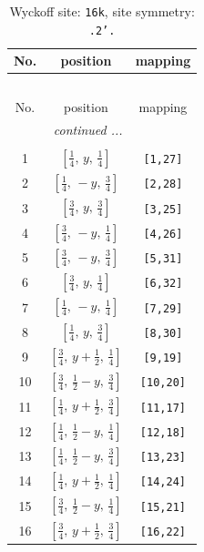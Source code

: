 \documentclass[fleqn,8pt]{jsarticle}
\begin{document}
\renewcommand{\arraystretch}{1.2}
\begin{longtable}{ccc}
\caption{Wyckoff site: {\tt 16k}, site symmetry: {\tt .2'.}}
 \\
 \hline \hline
No. & position & mapping \\ \hline \endfirsthead

\multicolumn{2}{l}{\tablename\ \thetable{}} \\
 \hline \hline
No. & position & mapping \\ \hline \endhead

 \hline \hline
\multicolumn{2}{r}{\footnotesize\it continued ...} \\ \endfoot

 \hline \hline
\multicolumn{2}{r}{} \\ \endlastfoot

1 & $\left[ \frac{1}{4},\, y,\, \frac{1}{4} \right]$ & {\tt [1,27]} \\ \hline
2 & $\left[ \frac{1}{4},\, - y,\, \frac{3}{4} \right]$ & {\tt [2,28]} \\ \hline
3 & $\left[ \frac{3}{4},\, y,\, \frac{3}{4} \right]$ & {\tt [3,25]} \\ \hline
4 & $\left[ \frac{3}{4},\, - y,\, \frac{1}{4} \right]$ & {\tt [4,26]} \\ \hline
5 & $\left[ \frac{3}{4},\, - y,\, \frac{3}{4} \right]$ & {\tt [5,31]} \\ \hline
6 & $\left[ \frac{3}{4},\, y,\, \frac{1}{4} \right]$ & {\tt [6,32]} \\ \hline
7 & $\left[ \frac{1}{4},\, - y,\, \frac{1}{4} \right]$ & {\tt [7,29]} \\ \hline
8 & $\left[ \frac{1}{4},\, y,\, \frac{3}{4} \right]$ & {\tt [8,30]} \\ \hline
9 & $\left[ \frac{3}{4},\, y + \frac{1}{2},\, \frac{1}{4} \right]$ & {\tt [9,19]} \\ \hline
10 & $\left[ \frac{3}{4},\, \frac{1}{2} - y,\, \frac{3}{4} \right]$ & {\tt [10,20]} \\ \hline
11 & $\left[ \frac{1}{4},\, y + \frac{1}{2},\, \frac{3}{4} \right]$ & {\tt [11,17]} \\ \hline
12 & $\left[ \frac{1}{4},\, \frac{1}{2} - y,\, \frac{1}{4} \right]$ & {\tt [12,18]} \\ \hline
13 & $\left[ \frac{1}{4},\, \frac{1}{2} - y,\, \frac{3}{4} \right]$ & {\tt [13,23]} \\ \hline
14 & $\left[ \frac{1}{4},\, y + \frac{1}{2},\, \frac{1}{4} \right]$ & {\tt [14,24]} \\ \hline
15 & $\left[ \frac{3}{4},\, \frac{1}{2} - y,\, \frac{1}{4} \right]$ & {\tt [15,21]} \\ \hline
16 & $\left[ \frac{3}{4},\, y + \frac{1}{2},\, \frac{3}{4} \right]$ & {\tt [16,22]} \\
\end{longtable}
\end{document}
